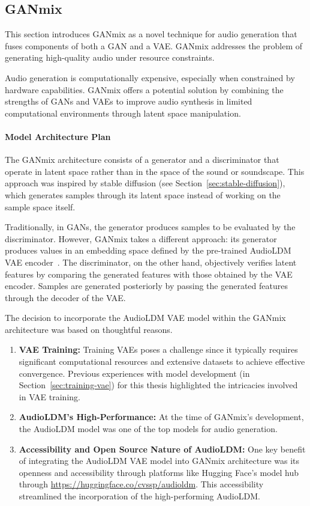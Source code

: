 \subsection{GANmix} \label{sec:ganmix}

This section introduces GANmix as a novel technique for audio generation that fuses components of both a \ac{GAN} and a \ac{VAE}. GANmix addresses the problem of generating high-quality audio under resource constraints.

Audio generation is computationally expensive, especially when constrained by hardware capabilities. GANmix offers a potential solution by combining the strengths of \acp{GAN} and \acp{VAE} to improve audio synthesis in limited computational environments through latent space manipulation.

\paragraph{Model Architecture Plan}

The GANmix architecture consists of a generator and a discriminator that operate in latent space rather than in the space of the sound or soundscape. This approach was inspired by stable diffusion (see Section~\ref{sec:stable-diffusion}), which generates samples through its latent space instead of working on the sample space itself.

Traditionally, in \acp{GAN}, the generator produces samples to be evaluated by the discriminator. However, GANmix takes a different approach: its generator produces values in an embedding space defined by the pre-trained AudioLDM \ac{VAE} encoder~\cite{liu_audioldm_2023}. The discriminator, on the other hand, objectively verifies latent features by comparing the generated features with those obtained by the \ac{VAE} encoder. Samples are generated posteriorly by passing the generated features through the decoder of the \ac{VAE}.

The decision to incorporate the AudioLDM \ac{VAE} model within the GANmix architecture was based on thoughtful reasons.

\begin{enumerate}
    \item \textbf{\ac{VAE} Training:} Training \acp{VAE} poses a challenge since it typically requires significant computational resources and extensive datasets to achieve effective convergence. Previous experiences with model development (in Section~\ref{sec:training-vae}) for this thesis highlighted the intricacies involved in \ac{VAE} training.
    \item \textbf{AudioLDM's High-Performance:} At the time of GANmix's development, the AudioLDM model was one of the top models for audio generation.
    \item \textbf{Accessibility and Open Source Nature of AudioLDM:} One key benefit of integrating the AudioLDM \ac{VAE} model into GANmix architecture was its openness and accessibility through platforms like Hugging Face's model hub through \url{https://huggingface.co/cvssp/audioldm}. This accessibility streamlined the incorporation of the high-performing AudioLDM.
\end{enumerate}

